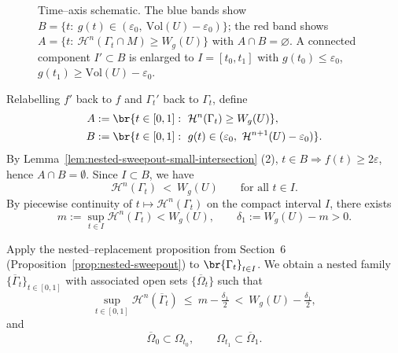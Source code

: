 \begin{figure}[htbp]
  \caption{Time–axis schematic. The blue bands show $B=\{t:\ g(t)\in(\varepsilon_0,\ \mathrm{Vol}(U)-\varepsilon_0)\}$; the red band shows $A=\{t:\ \mathcal H^n(\Gamma_t\cap M)\ge W_g(U)\}$ with $A\cap B=\varnothing$. A connected component $I'\subset B$ is enlarged to $I=[t_0,t_1]$ with $g(t_0)\le\varepsilon_0$, $g(t_1)\ge \mathrm{Vol}(U)-\varepsilon_0$.}
  \label{fig:time-axis-schematic}
\end{figure}

Relabelling $f'$ back to $f$ and $\Gamma_t'$ back to $\Gamma_t$, define
\begin{equation*}
    \begin{split}
        A&:=\br{t\in[0,1]:\ \mathcal{H}^n(\Gamma_t)\ge W_g(U)},\\
        B&:=\br{t\in[0,1]:\ g(t)\in(\varepsilon_0,\ \mathcal{H}^{n+1}(U)-\varepsilon_0)}.
    \end{split}
\end{equation*}
By Lemma~\ref{lem:nested-sweepout-small-intersection} (2), $t\in B\Rightarrow f(t)\ge 2\varepsilon$, hence $A\cap B=\emptyset$. Since $I\subset B$, we have
\begin{equation*}
\mathcal{H}^n(\Gamma_t)\ <\ W_g(U)\qquad\text{for all }t\in I.
\end{equation*}
By piecewise continuity of $t\mapsto \mathcal{H}^n(\Gamma_t)$ on the compact interval $I$, there exists
\begin{equation*}
m:=\sup_{t\in I}\mathcal{H}^n(\Gamma_t) < W_g(U),\qquad
\delta_1:=W_g(U)-m > 0.
\end{equation*}

Apply the nested–replacement proposition from Section~6 (Proposition~\ref{prop:nested-sweepout}) to $\br{\Gamma_t}_{t\in I}$. 
We obtain a nested family $\{\overline{\Gamma}_t\}_{t\in[0,1]}$ with associated open sets $\{\overline{\Omega}_t\}$ such that
\begin{equation*}
  \sup_{t\in[0,1]}\mathcal{H}^n(\overline{\Gamma}_t)\ \le\ m-\tfrac{\delta_1}{2}\ <\ W_g(U)-\tfrac{\delta_1}{2},
\end{equation*}
and
\begin{equation*}
  \overline{\Omega}_0\subset \Omega_{t_0},\qquad \Omega_{t_1}\subset \overline{\Omega}_1.
\end{equation*}

